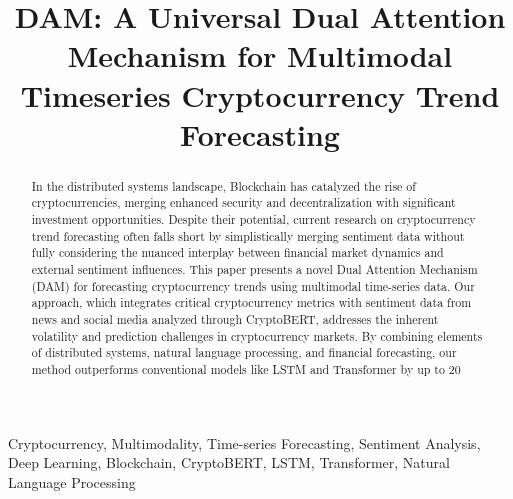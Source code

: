 
\title{DAM: A Universal Dual Attention Mechanism for Multimodal Timeseries Cryptocurrency Trend Forecasting}
\maketitle



\begin{abstract}
In the distributed systems landscape, Blockchain has catalyzed the rise of cryptocurrencies, merging enhanced security and decentralization with significant investment opportunities. Despite their potential, current research on cryptocurrency trend forecasting often falls short by simplistically merging sentiment data without fully considering the nuanced interplay between financial market dynamics and external sentiment influences. This paper presents a novel Dual Attention Mechanism (DAM) for forecasting cryptocurrency trends using multimodal time-series data. Our approach, which integrates critical cryptocurrency metrics with sentiment data from news and social media analyzed through CryptoBERT, addresses the inherent volatility and prediction challenges in cryptocurrency markets. By combining elements of distributed systems, natural language processing, and financial forecasting, our method outperforms conventional models like LSTM and Transformer by up to 20\


\end{abstract}

\begin{IEEEkeywords}
Cryptocurrency,
Multimodality,
Time-series Forecasting,
Sentiment Analysis,
Deep Learning,
Blockchain, 
CryptoBERT, 
LSTM, 
Transformer,
Natural Language Processing
\end{IEEEkeywords}






